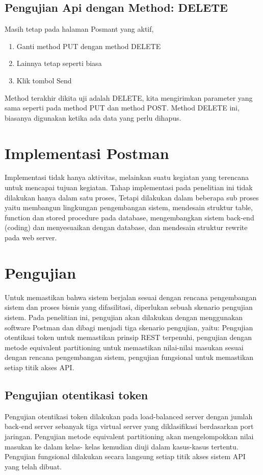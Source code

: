 \subsection{Pengujian Api dengan Method: DELETE}
Masih tetap pada halaman Posmant yang aktif,
\begin{enumerate}
\item Ganti method PUT dengan method DELETE
\item Lainnya tetap seperti biasa 
\item Klik tombol Send
\end{enumerate}
Method terakhir dikita uji adalah DELETE, kita mengirimkan parameter yang sama seperti pada method PUT dan method POST. Method DELETE ini, biasanya digunakan ketika ada data yang perlu dihapus.

\section{Implementasi Postman}
Implementasi tidak hanya aktivitas, melainkan suatu kegiatan yang terencana untuk mencapai
tujuan kegiatan. Tahap implementasi pada penelitian ini tidak dilakukan hanya dalam satu proses,
Tetapi dilakukan dalam beberapa sub proses yaitu membangun lingkungan pengembangan sistem, 
mendesain struktur table, function dan stored procedure pada database, mengembangkan sistem back-end (coding) 
dan menyesuaikan dengan database, dan mendesain struktur rewrite pada web server. 

\section{Pengujian}
Untuk memastikan bahwa sistem berjalan sesuai dengan rencana pengembangan sistem dan proses bisnis yang difasilitasi, diperlukan sebuah skenario pengujian sistem. Pada penelitian ini, pengujian akan dilakukan dengan menggunakan software Postman dan dibagi menjadi tiga skenario pengujian, yaitu: Pengujian otentikasi token untuk memastikan prinsip REST terpenuhi, pengujian dengan metode equivalent partitioning untuk memastikan nilai-nilai masukan sesuai dengan rencana pengembangan sistem, pengujian fungsional untuk memastikan setiap titik akses API.

\subsection{Pengujian otentikasi token}
Pengujian  otentikasi token dilakukan pada load-balanced server dengan jumlah back-end server sebanyak tiga virtual server yang diklasifikasi berdasarkan port jaringan. Pengujian  metode equivalent partitioning akan mengelompokkan nilai masukan ke dalam kelas- kelas kemudian diuji dalam kasus-kasus tertentu. Pengujian fungsional dilakukan secara langsung setiap titik akses sistem API yang telah dibuat. 


